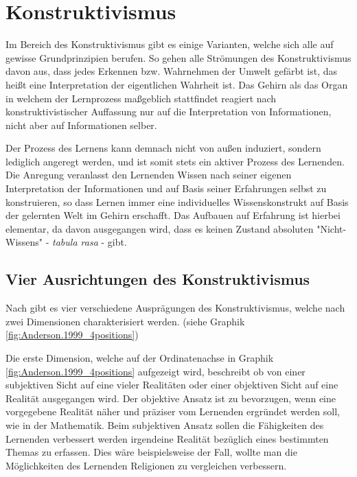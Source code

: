 \chapter{Konstruktivismus}
\label{cha:Konstruktivismus}
Im Bereich des Konstruktivismus gibt es einige Varianten, welche sich alle auf gewisse Grundprinzipien berufen. So gehen alle Strömungen des Konstruktivismus davon aus, dass jedes Erkennen bzw. Wahrnehmen der Umwelt gefärbt ist, das heißt eine Interpretation der eigentlichen Wahrheit ist. Das Gehirn als das Organ in welchem der Lernprozess maßgeblich stattfindet reagiert nach konstruktivistischer Auffassung nur auf die Interpretation von Informationen, nicht aber auf Informationen selber. \cite{Reinmann.2013} 

Der Prozess des Lernens kann demnach nicht von außen induziert, sondern lediglich angeregt werden, und ist somit stets ein aktiver Prozess des Lernenden.  \cite{Reinmann.2013} 
Die Anregung veranlasst den Lernenden Wissen nach seiner eigenen Interpretation der Informationen und auf Basis seiner Erfahrungen selbst zu konstruieren, so dass Lernen immer eine individuelles Wissenskonstrukt auf Basis der gelernten Welt im Gehirn erschafft. \cite{Edelmann.2012} Das Aufbauen auf Erfahrung ist hierbei elementar, da davon ausgegangen wird, dass es keinen Zustand absoluten "Nicht-Wissens" - \emph{tabula rasa} - gibt. \cite{Anderson.1999}

\section{Vier Ausrichtungen des Konstruktivismus}
\label{sec:Konstr_4positions}

Nach \cite{Anderson.1999} gibt es vier verschiedene Ausprägungen des Konstruktivismus, welche nach zwei Dimensionen charakterisiert werden. (siehe Graphik \ref{fig:Anderson.1999_4positions})

Die erste Dimension, welche auf der Ordinatenachse in Graphik \ref{fig:Anderson.1999_4positions} aufgezeigt wird, beschreibt ob von einer subjektiven Sicht auf eine vieler Realitäten oder einer objektiven Sicht auf eine Realität ausgegangen wird. 
Der objektive Ansatz ist zu bevorzugen, wenn eine vorgegebene Realität näher und präziser vom Lernenden ergründet werden soll, wie in der Mathematik. Beim subjektiven Ansatz sollen die Fähigkeiten des Lernenden verbessert werden irgendeine Realität bezüglich eines bestimmten Themas zu erfassen. Dies wäre beispielsweise der Fall, wollte man die Möglichkeiten des Lernenden Religionen zu vergleichen verbessern. \cite{Anderson.1999}

